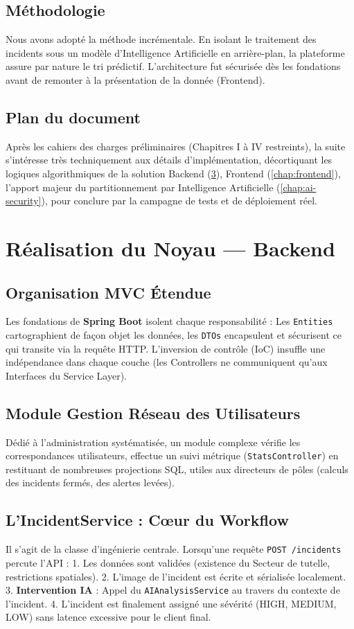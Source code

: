 \documentclass[12pt,a4paper,oneside]{book} %
\begin{document}
\section{Méthodologie}
Nous avons adopté la méthode incrémentale. En isolant le traitement des incidents sous un modèle d'Intelligence Artificielle en arrière-plan, la plateforme assure par nature le tri prédictif. L'architecture fut sécurisée dès les fondations avant de remonter à la présentation de la donnée (Frontend).

\section{Plan du document}
Après les cahiers des charges préliminaires (Chapitres I à IV restreints), la suite s'intéresse très techniquement aux détails d'implémentation, décortiquant les logiques algorithmiques de la solution Backend (\cref{chap:real}), Frontend (\cref{chap:frontend}), l'apport majeur du partitionnement par Intelligence Artificielle (\cref{chap:ai-security}), pour conclure par la campagne de tests et de déploiement réel.

\chapter{Réalisation du Noyau — Backend}
\label{chap:real}

\section{Organisation MVC Étendue}
Les fondations de \textbf{Spring Boot} isolent chaque responsabilité : 
Les \texttt{Entities} cartographient de façon objet les données, les \texttt{DTOs} encapsulent et sécurisent ce qui transite via la requête HTTP. L'inversion de contrôle (IoC) insuffle une indépendance dans chaque couche (les Controllers ne communiquent qu'aux Interfaces du Service Layer).

\section{Module Gestion Réseau des Utilisateurs}
Dédié à l'administration systématisée, un module complexe vérifie les correspondances utilisateurs, effectue un suivi métrique (\texttt{StatsController}) en restituant de nombreuses projections SQL, utiles aux directeurs de pôles (calculs des incidents fermés, des alertes levées).

\section{L'IncidentService : Cœur du Workflow}
Il s'agit de la classe d'ingénierie centrale. Lorsqu'une requête \texttt{POST /incidents} percute l'API :
1. Les données sont validées (existence du Secteur de tutelle, restrictions spatiales).
2. L'image de l'incident est écrite et sérialisée localement.
3. \textbf{Intervention IA} : Appel du \texttt{AIAnalysisService} au travers du contexte de l'incident.
4. L'incident est finalement assigné une sévérité (HIGH, MEDIUM, LOW) sans latence excessive pour le client final.
\end{document}
